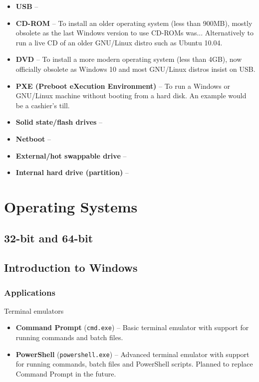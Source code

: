 \documentclass{article}
\begin{document}
\begin{itemize}
    \item \textbf{USB} -- 
    \item \textbf{CD-ROM} -- To install an older operating system (less than 900MB), mostly obsolete as the last Windows version to use CD-ROMs was... Alternatively to run a live CD of an older GNU/Linux distro such as Ubuntu 10.04.
    \item \textbf{DVD} -- To install a more modern operating system (less than 4GB), now officially obsolete as Windows 10 and most GNU/Linux distros insist on USB.
    \item \textbf{PXE (Preboot eXecution Environment)} -- To run a Windows or GNU/Linux machine without booting from a hard disk. An example would be a cashier's till.
    \item \textbf{Solid state/flash drives} --
    \item \textbf{Netboot} --
    \item \textbf{External/hot swappable drive} --
    \item \textbf{Internal hard drive (partition)} --
\end{itemize}

\section{Operating Systems}


\subsection{32-bit and 64-bit}

\subsection{Introduction to Windows}

\subsubsection{Applications}

Terminal emulators
\begin{itemize}
    \item \textbf{Command Prompt} (\texttt{cmd.exe}) -- Basic terminal emulator with support for running commands and batch files.
    \item \textbf{PowerShell} (\texttt{powershell.exe}) -- Advanced terminal emulator with support for running commands, batch files and PowerShell scripts. Planned to replace Command Prompt in the future.
\end{itemize}
\end{document}
